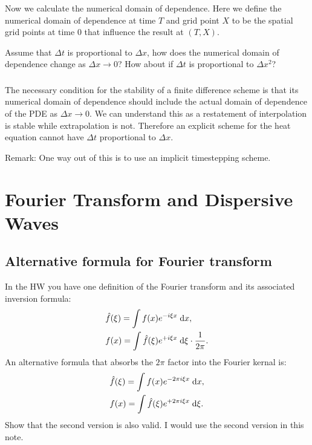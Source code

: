 \documentclass[11pt,letterpaper]{report}
\begin{document}
\subsection{}
Now we calculate the numerical domain of dependence. Here we define the numerical domain of dependence at time $T$ and grid point $X$ to be the spatial grid points at time $0$ that influence the result at $(T,X)$.

Assume that $\Delta t$ is proportional to $\Delta x$, how does the numerical domain of dependence change as $\Delta x\to 0$? How about if $\Delta t$ is proportional to $\Delta x^2$?

\subsection{}
The necessary condition for the stability of a finite difference scheme is that its numerical domain of dependence should include the actual domain of dependence of the PDE as $\Delta x\to 0$. We can understand this as a restatement of interpolation is stable while extrapolation is not. Therefore an explicit scheme for the heat equation cannot have $\Delta t$ proportional to $\Delta x$. 

Remark: One way out of this is to use an implicit timestepping scheme.

\chapter{Fourier Transform and Dispersive Waves}
\section{Alternative formula for Fourier transform}
In the HW you have one definition of the Fourier transform and its associated inversion formula:
\begin{align}
    &\hat f(\xi) = \int f(x)e^{-i\xi x} \;\mathrm{d} x,\\
    &f(x) = \int \hat f(\xi)e^{+i\xi x} \;\mathrm{d} \xi \cdot\frac{1}{2\pi}.
\end{align}
An alternative formula that absorbs the $2\pi$ factor into the Fourier kernal is:
\begin{align}
    &\hat f(\xi ) = \int f(x)e^{-2\pi i\xi x} \;\mathrm{d} x,\\
    &f(x) = \int \hat f(\xi)e^{+2\pi i \xi x} \;\mathrm{d} \xi \label{eq:Four_inv}.
\end{align}
Show that the second version is also valid. I would use the second version in this note.
\end{document}
